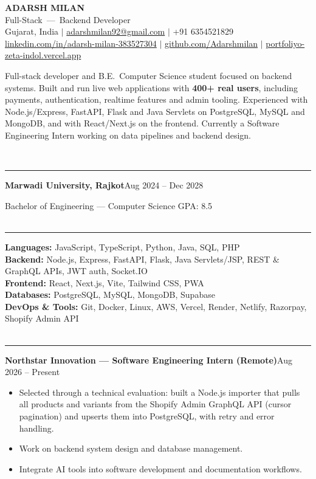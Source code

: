 \documentclass[10pt,a4paper]{article}
\renewcommand{\section}[1]{\vspace{6pt}{\large\bfseries\MakeUppercase{#1}}\\[-7pt]\rule{\textwidth}{0.6pt}\vspace{2pt}}
\newcommand{\entry}[2]{\par\textbf{#1}\hfill #2\par}
\newenvironment{points}{\vspace{-4pt}\begin{itemize}\setlength{\itemsep}{0pt}\setlength{\parskip}{0pt}\setlength{\topsep}{0pt}\setlength{\partopsep}{0pt}\setlength{\leftmargin}{12pt}}{\end{itemize}\vspace{-2pt}}
\newcommand{\sep}{\enspace$|$\enspace}
\begin{document}
\begin{center}
  {\Huge\bfseries ADARSH MILAN}\\[3pt]
  {\large Full-Stack \,---\, Backend Developer}\\[3pt]
  Gujarat, India \sep
  \href{mailto:adarshmilan92@gmail.com}{adarshmilan92@gmail.com} \sep
  +91 6354521829\\[1pt]
  \href{https://www.linkedin.com/in/adarsh-milan-383527304}{linkedin.com/in/adarsh-milan-383527304} \sep
  \href{https://github.com/Adarshmilan}{github.com/Adarshmilan} \sep
  \href{https://portfoliyo-zeta-indol.vercel.app/}{portfoliyo-zeta-indol.vercel.app}
\end{center}

Full-stack developer and B.E.\ Computer Science student focused on backend systems. Built and run live web
applications with \textbf{400+ real users}, including payments, authentication, realtime features and admin tooling.
Experienced with Node.js/Express, FastAPI, Flask and Java Servlets on PostgreSQL, MySQL and MongoDB, and with
React/Next.js on the frontend. Currently a Software Engineering Intern working on data pipelines and backend design.

\section{Education}
\entry{Marwadi University, Rajkot}{Aug 2024 -- Dec 2028}
Bachelor of Engineering --- Computer Science \hfill GPA: 8.5\\

\section{Skills}
\textbf{Languages:} JavaScript, TypeScript, Python, Java, SQL, PHP\\
\textbf{Backend:} Node.js, Express, FastAPI, Flask, Java Servlets/JSP, REST \& GraphQL APIs, JWT auth, Socket.IO\\
\textbf{Frontend:} React, Next.js, Vite, Tailwind CSS, PWA\\
\textbf{Databases:} PostgreSQL, MySQL, MongoDB, Supabase\\
\textbf{DevOps \& Tools:} Git, Docker, Linux, AWS, Vercel, Render, Netlify, Razorpay, Shopify Admin API\\

\section{Experience}
\entry{Northstar Innovation --- Software Engineering Intern (Remote)}{Aug 2026 -- Present}
\begin{points}
  \item Selected through a technical evaluation: built a Node.js importer that pulls all products and variants from the Shopify Admin GraphQL API (cursor pagination) and upserts them into PostgreSQL, with retry and error handling.
  \item Work on backend system design and database management.
  \item Integrate AI tools into software development and documentation workflows.
\end{points}
\end{document}
